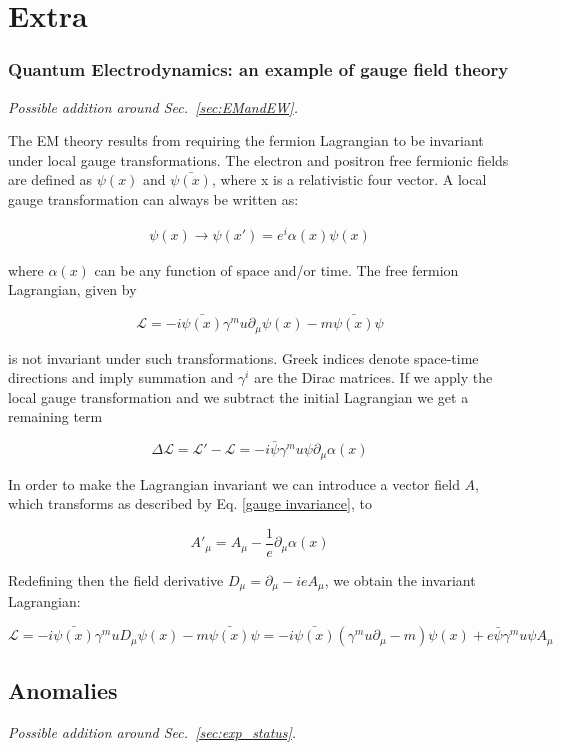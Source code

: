 \chapter{Extra}

\subsection{Quantum Electrodynamics: an example of gauge field theory }

{\em Possible addition around Sec.~\ref{sec:EMandEW}.}



The EM theory results from requiring the fermion Lagrangian to be invariant under local gauge transformations.
The electron and positron free fermionic fields are defined as $\psi(x)$ and $\bar{\psi(x)}$, where x is a relativistic four vector.
A local gauge transformation can always be written as:

\begin{align}
\psi(x) \rightarrow \psi(x') = e^i{\alpha(x)}\psi(x)
\end{align}

where $\alpha(x)$ can be any function of space and/or time. The free fermion Lagrangian, given by

\begin{equation}
\mathcal{L} = -i \bar{\psi(x)} \gamma^mu \partial_\mu \psi(x) - m\bar{\psi(x)} \psi
\end{equation}

is not invariant under such transformations. Greek indices denote space-time directions and imply summation and $\gamma^i$ are the Dirac matrices. If we apply the local gauge transformation and we subtract the initial Lagrangian we get a remaining term

\begin{equation}
\Delta \mathcal{L} = \mathcal{L}' - \mathcal{L} = -i \bar{\psi}  \gamma^mu \psi \partial_\mu \alpha(x)
\end{equation}

In order to make the Lagrangian invariant we can introduce a vector field $A$, which transforms as described by Eq. \ref{gauge invariance},  to %

\begin{equation}
\label{gauge invariance}
A'_\mu = A_\mu -\frac{1}{e}\partial_\mu \alpha(x)
\end{equation}

Redefining then the field derivative $D_\mu = \partial_\mu - ieA_\mu$, we obtain the invariant Lagrangian:

\begin{equation}
\mathcal{L} = -i \bar{\psi(x)} \gamma^mu D_\mu \psi(x)  - m\bar{\psi(x)} \psi = -i \bar{\psi(x)} (\gamma^mu \partial_\mu  - m)\psi(x) + e\bar{\psi}  \gamma^mu \psi A_\mu
\end{equation}


\section{Anomalies}

{\em Possible addition around Sec.~\ref{sec:exp_status}.}








